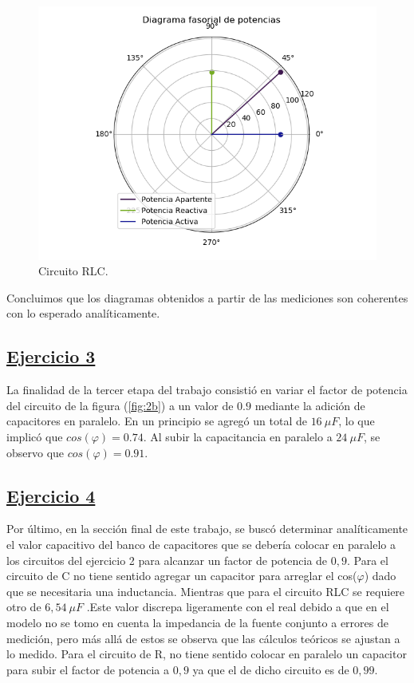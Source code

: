 \documentclass[a4paper]{article}
\begin{document}
\begin{figure}[H]
\begin{minipage}{.5\textwidth}
\end{minipage}\\
\begin{minipage}{.5\textwidth}
  \centering
  \includegraphics[width=1.2\linewidth]{Diag-Fas-2C}
  \caption{Circuito RLC.}
\end{minipage}
\end{figure}
 Concluimos que los diagramas obtenidos a partir de las mediciones son coherentes con lo esperado analíticamente.
\subsection*{\underline{Ejercicio 3}}
La finalidad de la tercer etapa del trabajo consistió en variar el factor de potencia del circuito de la figura (\ref{fig:2b}) a un valor de $ 0.9 $ mediante la adición de capacitores en paralelo. En un principio se agregó un total de $ 16 \ \mu F$, lo que implicó que $ cos \left(\varphi \right) = 0.74 $. Al subir la capacitancia en paralelo a $ 24 \ \mu F$, se observo que $ cos \left(\varphi \right) = 0.91 $.

\subsection*{\underline{Ejercicio 4}}
Por último, en la sección final de este trabajo, se buscó determinar analíticamente el valor capacitivo del banco de capacitores que se debería colocar en paralelo a los circuitos del ejercicio 2 para alcanzar un factor de potencia de $ 0,9 $. Para el circuito de C no tiene sentido agregar un capacitor para arreglar el cos($\varphi$) dado que se necesitaria una inductancia. Mientras que para el circuito RLC se requiere otro de $ 6,54 \ \mu F $ .Este valor discrepa ligeramente con el real debido a que en el modelo no se tomo en cuenta la impedancia de la fuente conjunto a errores de medición, pero más allá de estos se observa que las cálculos teóricos se ajustan a lo medido. Para el circuito de R, no tiene sentido colocar en paralelo un capacitor para subir el factor de potencia a $ 0,9 $ ya que el de dicho circuito es de $ 0,99 $.
\end{document}
